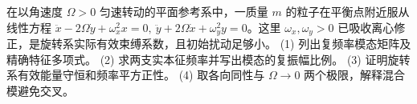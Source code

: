 在以角速度 \(\Omega>0\) 匀速转动的平面参考系中，一质量 \(m\) 的粒子在平衡点附近服从线性方程 \(\ddot x-2\Omega\dot y+\omega_x^2x=0,\ \ddot y+2\Omega\dot x+\omega_y^2y=0\)。这里 \(\omega_x,\omega_y>0\) 已吸收离心修正，是旋转系实际有效束缚系数，且初始扰动足够小。
(1) 列出复频率模态矩阵及精确特征多项式。
(2) 求两支实本征频率并写出模态的复振幅比例。
(3) 证明旋转系有效能量守恒和频率平方正性。
(4) 取各向同性与 \(\Omega\to0\) 两个极限，解释混合模避免交叉。
